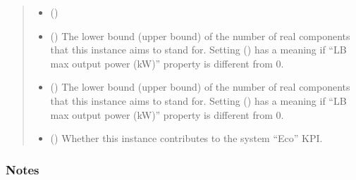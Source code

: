 \documentclass[letterpaper,10pt,english]{sphinxmanual}
\begin{document}
\begin{fulllineitems}
\begin{fulllineitems}
\begin{quote}
\begin{description}
\begin{itemize}
\item {} 
\sphinxAtStartPar
{} (\sphinxstyleliteralemphasis{\sphinxupquote{, }}) \textendash{} 

\item {} 
\sphinxAtStartPar
{} (\sphinxstyleliteralemphasis{\sphinxupquote{, }}\sphinxstyleliteralemphasis{\sphinxupquote{, }}) \textendash{} The lower bound (upper bound) of the number of real components that this instance aims to stand for.
Setting  () has a meaning if “LB max output power (kW)” property is
different from 0.

\item {} 
\sphinxAtStartPar
{} (\sphinxstyleliteralemphasis{\sphinxupquote{, }}\sphinxstyleliteralemphasis{\sphinxupquote{, }}) \textendash{} The lower bound (upper bound) of the number of real components that this instance aims to stand for.
Setting  () has a meaning if “LB max output power (kW)” property is
different from 0.

\item {} 
\sphinxAtStartPar
{} (\sphinxstyleliteralemphasis{\sphinxupquote{, }}\sphinxstyleliteralemphasis{\sphinxupquote{, }}) \textendash{} Whether this instance contributes to the system “Eco” KPI.

\end{itemize}

\end{description}\end{quote}
\subsubsection*{Notes}


\end{fulllineitems}
\end{fulllineitems}
\end{document}
